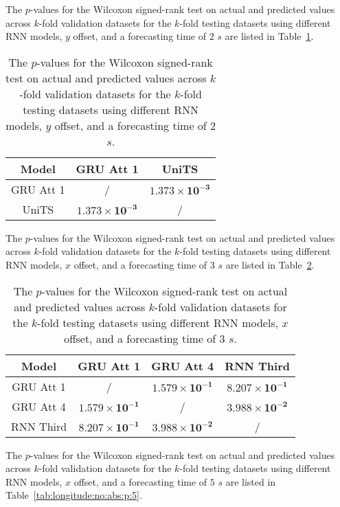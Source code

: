 The $p$-values for the Wilcoxon signed-rank test on actual and predicted values across $k$-fold validation datasets for the $k$-fold testing datasets using different RNN models, $y$ offset, and a forecasting time of $2$ $s$ are listed in Table~\ref{tab:latitude:no:abs:p:2}.

\begin{table}[!ht]
	\centering
	\begin{tabular}{|c|c|c|}
		\hline
		Model & GRU Att 1 & UniTS \\ \hline
		GRU Att 1 & / & $\mathbf{1.373 \times 10^{-3}}$ \\ \hline
		UniTS & $\mathbf{1.373 \times 10^{-3}}$ & / \\ \hline
	\end{tabular}
	\caption{The $p$-values for the Wilcoxon signed-rank test on actual and predicted values across $k$-fold validation datasets for the $k$-fold testing datasets using different RNN models, $y$ offset, and a forecasting time of $2$ $s$.}
	\label{tab:latitude:no:abs:p:2}
\end{table}

The $p$-values for the Wilcoxon signed-rank test on actual and predicted values across $k$-fold validation datasets for the $k$-fold testing datasets using different RNN models, $x$ offset, and a forecasting time of $3$ $s$ are listed in Table~\ref{tab:longitude:no:abs:p:3}.

\begin{table}[!ht]
	\centering
	\begin{tabular}{|c|c|c|c|}
		\hline
		Model & GRU Att 1 & GRU Att 4 & RNN Third \\ \hline
		GRU Att 1 & / & $\mathbf{1.579 \times 10^{-1}}$ & $\mathbf{8.207 \times 10^{-1}}$ \\ \hline
		GRU Att 4 & $\mathbf{1.579 \times 10^{-1}}$ & / & $\mathbf{3.988 \times 10^{-2}}$ \\ \hline
		RNN Third & $\mathbf{8.207 \times 10^{-1}}$ & $\mathbf{3.988 \times 10^{-2}}$ & / \\ \hline
	\end{tabular}
	\caption{The $p$-values for the Wilcoxon signed-rank test on actual and predicted values across $k$-fold validation datasets for the $k$-fold testing datasets using different RNN models, $x$ offset, and a forecasting time of $3$ $s$.}
	\label{tab:longitude:no:abs:p:3}
\end{table}

The $p$-values for the Wilcoxon signed-rank test on actual and predicted values across $k$-fold validation datasets for the $k$-fold testing datasets using different RNN models, $x$ offset, and a forecasting time of $5$ $s$ are listed in Table~\ref{tab:longitude:no:abs:p:5}.

